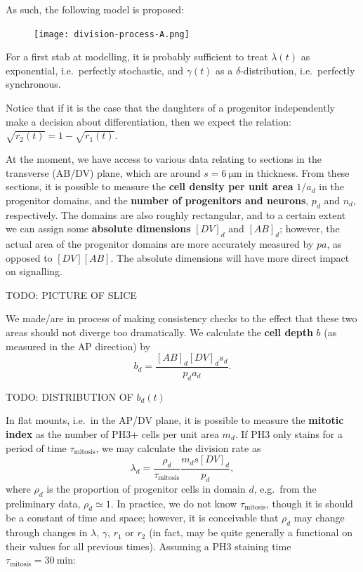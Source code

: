 \documentclass[10pt,english]{article}
\begin{document}
As such, the following model is proposed:

\begin{figure}[h]
	\begin{center}
		\texttt{[image: division-process-A.png]}
	\end{center}
	\label{fig:division-process-A}
\end{figure}

For a first stab at modelling, it is probably sufficient to treat $\lambda(t)$ as exponential, i.e.\ perfectly stochastic, and $\gamma(t)$ as a $\delta$-distribution, i.e.\ perfectly synchronous.

Notice that if it is the case that the daughters of a progenitor independently make a decision about differentiation, then we expect the relation: $\sqrt{r_2 (t)} = 1 - \sqrt{r_1(t)}$.

At the moment, we have access to various data relating to sections in the transverse (AB/DV) plane, which are around $s = \SI{6}{\micro\metre}$ in thickness. From these sections, it is possible to measure the \textbf{cell density per unit area} $1/a_d$ in the progenitor domains, and the \textbf{number of progenitors and neurons}, $p_d$ and $n_d$, respectively. The domains are also roughly rectangular, and to a certain extent we can assign some \textbf{absolute dimensions} $[DV]_d$ and $[AB]_d$; however, the actual area of the progenitor domains are more accurately measured by $p a$, as opposed to $[DV][AB]$. The absolute dimensions will have more direct impact on signalling.

TODO: PICTURE OF SLICE

We made/are in process of making consistency checks to the effect that these two areas should not diverge too dramatically. We calculate the \textbf{cell depth} $b$ (as measured in the AP direction) by $$b_d = \frac{[AB]_d[DV]_d s_d}{p_d a_d}.$$

TODO: DISTRIBUTION OF $b_d(t)$

In flat mounts, i.e.\ in the AP/DV plane, it is possible to measure the \textbf{mitotic index} as the number of PH3+ cells per unit area $m_d$. If PH3 only stains for a period of time $\tau_\textrm{mitosis}$, we may calculate the division rate as $$\lambda_d = \frac{\rho_d}{\tau_\textrm{mitosis}}\frac{m_d s [DV]_d}{p_d},$$ where $\rho_d$ is the proportion of progenitor cells in domain $d$, e.g.\ from the preliminary data, $\rho_d \simeq 1$. In practice, we do not know $\tau_\textrm{mitosis}$, though it is should be a constant of time and space; however, it is conceivable that $\rho_d$ may change through changes in $\lambda$, $\gamma$, $r_1$ or $r_2$ (in fact, may be quite generally a functional on their values for all previous times). Assuming a PH3 staining time $\tau_\textrm{mitosis} = \SI{30}{\minute}$:
\end{document}
